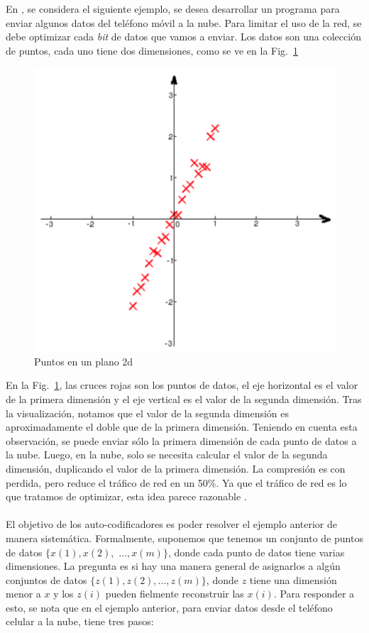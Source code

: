     En \cite{Le15atutorial}, se considera el siguiente ejemplo, se desea desarrollar un programa para enviar algunos datos del teléfono móvil a la nube. Para limitar el uso de la red, se debe optimizar cada \textit{bit} de datos que vamos a enviar. Los datos son una colección de puntos, cada uno tiene dos dimensiones, como se ve en la Fig.~\ref{fig:aenco1}
    \begin{figure}[htp]
        \centering
        \includegraphics[scale=0.37]{chapter3/aenco1.png}
        \caption{Puntos en un plano 2d}
        \label{fig:aenco1}
    \end{figure}

    En la Fig.~\ref{fig:aenco1}, las cruces rojas son los puntos de datos, el eje horizontal es el valor de la primera dimensión y el eje vertical es el valor de la segunda dimensión. Tras la visualización, notamos que el valor de la segunda dimensión es aproximadamente el doble que de la primera dimensión. Teniendo en cuenta esta observación, se puede enviar sólo la primera dimensión de cada punto de datos a la nube. Luego, en la nube, solo se necesita calcular el valor de la segunda dimensión, duplicando el valor de la primera dimensión. La compresión es con perdida, pero reduce el tráfico de red en un 50\%. Ya que el tráfico de red es lo que tratamos de optimizar, esta idea parece razonable \cite{Le15atutorial}.
    \\\\
    El objetivo de los auto-codificadores es poder resolver el ejemplo anterior de manera sistemática. Formalmente, suponemos que tenemos un conjunto de puntos de datos $\{x(1), x(2),$ $..., x(m)\}$, donde cada punto de datos tiene varias dimensiones. La pregunta es si hay una manera general de asignarlos a algún conjuntos de datos $\{z(1), z(2), ..., z(m)\}$, donde $z$ tiene una dimensión menor a $x$ y los $z(i)$ pueden fielmente reconstruir las $x(i)$. Para responder a esto, se nota que en el ejemplo anterior, para enviar datos desde el teléfono celular a la nube, tiene tres pasos:

